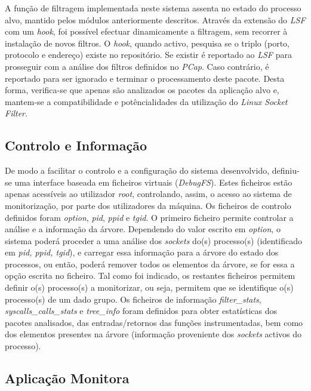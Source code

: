 \documentclass[a4paper]{llncs}
\begin{document}
A função de filtragem implementada neste sistema assenta no estado do processo alvo, mantido pelos módulos anteriormente descritos.
 Através da extensão do \textit{LSF} com um \textit{hook}, foi possível efectuar dinamicamente a filtragem, sem recorrer à instalação de novos filtros.
 O \textit{hook}, quando activo, pesquisa se o triplo (porto, protocolo e endereço) existe no repositório.
 Se existir é reportado ao \textit{LSF} para prosseguir com a análise dos filtros definidos no \textit{PCap}.
 Caso contrário, é reportado para ser ignorado e terminar o processamento deste pacote.
 Desta forma, verifica-se que apenas são analizados os pacotes da aplicação alvo e, mantem-se a compatibilidade e potêncialidades da utilização do \textit{Linux Socket Filter}.

\subsection*{Controlo e Informação}
\label{sub:data_information}

De modo a facilitar o controlo e a configuração do sistema desenvolvido, definiu-se uma interface baseada em ficheiros virtuais (\textit{DebugFS}).
 Estes ficheiros estão apenas acessíveis ao utilizador \textit{root}, controlando, assim, o acesso ao sistema de monitorização, por parte dos utilizadores da máquina.
 Os ficheiros de controlo definidos foram \textit{option}, \textit{pid}, \textit{ppid} e \textit{tgid}.
 O primeiro ficheiro permite controlar a análise e a informação da árvore.
 Dependendo do valor escrito em \textit{option}, o sistema poderá proceder a uma análise dos \textit{sockets} do(s) processo(s) (identificado em \textit{pid, ppid, tgid}), e carregar essa informação para a árvore do estado dos processos, ou então, poderá remover todos os elementos da árvore, se for essa a opção escrita no ficheiro.
 Tal como foi indicado, os restantes ficheiros permitem definir o(s) processo(s) a monitorizar, ou seja, permitem que se identifique o(s) processo(s) de um dado grupo.
 Os ficheiros de informação \textit{filter\_stats}, \textit{syscalls\_calls\_stats} e \textit{tree\_info} foram definidos para obter estatísticas dos pacotes analisados, das entradas/retornos das funções instrumentadas, bem como dos elementos presentes na árvore (informação proveniente dos \textit{sockets} activos do processo).

\subsection{Aplicação Monitora}
\label{sub:monitor_app}
\end{document}

